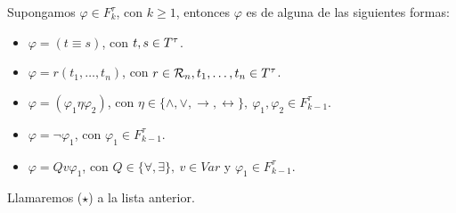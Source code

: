   \begin{lemma} \label{lemma_36}
    \PN Supongamos $\varphi \in F_{k}^{\tau}$, con $k \geq 1$, entonces $\varphi$ es de alguna de las siguientes formas:
    \begin{itemize}
      \item $\varphi = (t \equiv s)$, con $t, s \in T^{\tau}$.
      \item $\varphi = r(t_{1}, \dotsc, t_{n})$, con $r \in \mathcal{R}_{n}, t_{1}, \dotsc, t_{n} \in T^{\tau}$.
      \item $\varphi = (\varphi_{1} \eta \varphi_{2})$, con $\eta \in \{\wedge, \vee, \rightarrow, \leftrightarrow\}, \
        \varphi_{1}, \varphi_{2} \in F_{k-1}^{\tau}$.
      \item $\varphi = \lnot \varphi_{1}$, con $\varphi_{1} \in F_{k-1}^{\tau}$.
      \item $\varphi = Qv\varphi_{1}$, con $Q \in \{\forall, \exists\}, \ v \in Var$ y $\varphi_{1} \in F_{k-1}^{\tau}$.
    \end{itemize}
    \PN Llamaremos ($\star$) a la lista anterior.
  \end{lemma}
